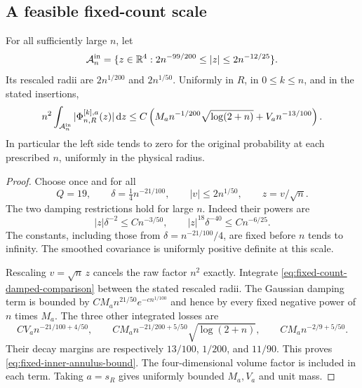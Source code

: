 \subsection{A feasible fixed-count scale}
\begin{theorem}
\label{thm:fixed-return-inner-annulus}
For all sufficiently large $n$, let
\begin{equation}\label{eq:new-fixed-inner-annulus}
 \mathcal A_n^{\rm in}
 =\{z\in\R^4:2n^{-99/200}\le |z|\le2n^{-12/25}\}.
\end{equation}
Its rescaled radii are $2n^{1/200}$ and $2n^{1/50}$. Uniformly in
$R$, in $0\le k\le n$, and in the stated insertions,
\begin{equation}\label{eq:fixed-inner-annulus-bound}
 n^2\int_{\mathcal A_n^{\rm in}}
       |\Phi^{[k],a}_{n,R}(z)|\dd z
 \le C\left(M_an^{-1/200}\sqrt{\log(2+n)}
                         +V_an^{-13/100}\right).
\end{equation}
In particular the left side tends to zero for the original probability
at each prescribed $n$, uniformly in the physical radius.
\end{theorem}
\begin{proof}
Choose once and for all
\begin{equation}\label{eq:fixed-count-feasible-scales}
 Q=19,\qquad \delta=\tfrac14n^{-21/100},
 \qquad |v|\le2n^{1/50},\qquad z=v/\sqrt n.
\end{equation}
The two damping restrictions hold for large $n$. Indeed their powers
are
\[
 |z|\delta^{-2}\le Cn^{-3/50},\qquad
 |z|^{18}\delta^{-40}\le Cn^{-6/25}.
\]
The constants, including those from $\delta= n^{-21/100}/4$, are
fixed before $n$ tends to infinity. The smoothed covariance is
uniformly positive definite at this scale.

Rescaling $v=\sqrt n\,z$ cancels the raw factor $n^2$ exactly.
Integrate \eqref{eq:fixed-count-damped-comparison} between the stated
rescaled radii. The Gaussian damping term is bounded by
$CM_an^{21/50}e^{-c n^{1/100}}$ and hence by every fixed negative
power of $n$ times $M_a$. The three other integrated losses are
\[
 CV_a n^{-21/100+4/50},\qquad
 CM_a n^{-21/200+5/50}\sqrt{\log(2+n)},\qquad
 CM_a n^{-2/9+5/50}.
\]
Their decay margins are respectively $13/100$, $1/200$, and
$11/90$. This proves \eqref{eq:fixed-inner-annulus-bound}.
The four-dimensional volume factor is included in each term. Taking
$a=s_R$ gives uniformly bounded $M_a,V_a$ and unit mass.
\end{proof}

